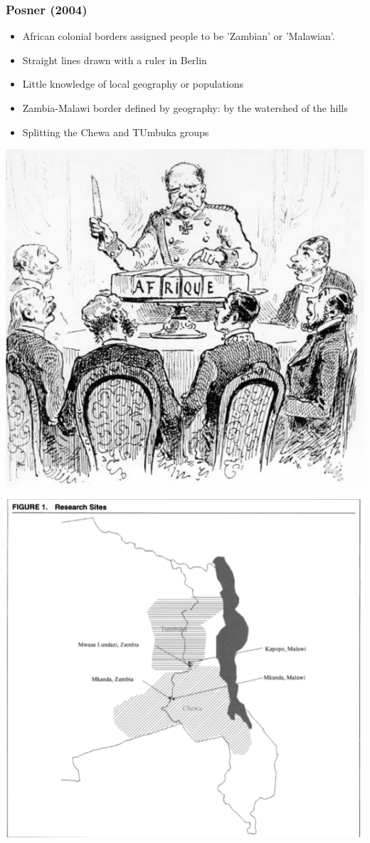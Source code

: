 \documentclass[xcolor=x11names,compress]{beamer}\usepackage[]{graphicx}\usepackage[]{color}
\renewcommand{\(}{\begin{columns}}
\renewcommand{\)}{\end{columns}}
\newcommand{\<}[1]{\begin{column}{#1}}
\renewcommand{\>}{\end{column}}
\begin{document}
\begin{frame}
\frametitle{Posner (2004)}
\begin{itemize}
\item African colonial borders assigned people to be 'Zambian' or 'Malawian'. 
\pause
\item Straight lines drawn with a ruler in Berlin
\pause
\item Little knowledge of local geography or populations
\pause
\item Zambia-Malawi border defined by geography: by the watershed of the hills
\pause
\item Splitting the Chewa and TUmbuka groups
\end{itemize}
\end{frame}

\includegraphics[width=1\textwidth]{Arbitrary_borders.jpg}

\includegraphics[width=1\textwidth]{Posner_map.png}
\end{document}

